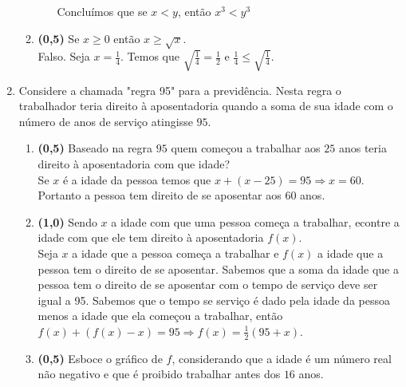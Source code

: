 \documentclass[a4paper,12pt]{article}
\begin{document}
\begin{enumerate}
\begin{enumerate}
\begin{enumerate}
 Concluímos que se $x<y$, então $x^3<y^3$\\
 
 \end{enumerate}
\vspace{3mm}
\item{\bf (0,5)} Se $x\geq 0$ então $x\geq \sqrt{x}$.\\
Falso. Seja $x=\frac{1}{4}$. Temos que $\sqrt{\frac{1}{4}}=\frac{1}{2}$ e $\frac{1}{4}\leq\sqrt{\frac{1}{4}}$.
\end{enumerate}

\vspace{5mm}
\item Considere a chamada "regra 95" para a previdência.  Nesta regra o trabalhador teria direito à aposentadoria quando a soma de sua idade com o número de anos de serviço atingisse $95$. 

\begin{enumerate}
\item {\bf (0,5)} Baseado na regra $95$ quem começou a trabalhar aos $25$ anos teria direito à aposentadoria com que idade?\\
\vspace{3mm}
Se $x$ é a idade da pessoa temos que $x+(x-25)=95\Rightarrow x=60$. Portanto a pessoa tem direito de se aposentar aos $60$ anos.
\item {\bf (1,0)} Sendo $x$ a idade com que uma pessoa começa a trabalhar, econtre a idade com que ele tem direito à aposentadoria $f(x)$.\\
\vspace{3mm}
Seja $x$ a idade que a pessoa começa a trabalhar e $f(x)$ a idade que a pessoa tem o direito de se aposentar. Sabemos que a soma da idade que a pessoa tem o direito de se aposentar com o tempo de serviço deve ser igual a 95.
 Sabemos que o tempo se serviço é dado pela idade da pessoa menos a idade que ela começou a trabalhar, então $f(x)+(f(x)-x)=95\Rightarrow f(x)=\frac{1}{2}(95+x).$
\item{\bf (0,5)}  Esboce o gráfico de $f$, considerando que a idade é um número real não negativo e que é proibido trabalhar antes dos $16$ anos.
\end{enumerate}
\end{enumerate}
\end{document}
